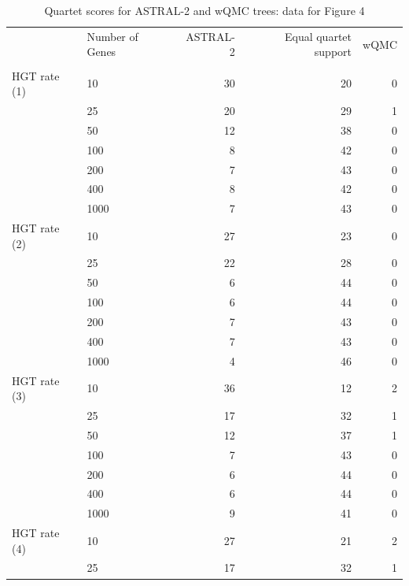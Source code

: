 \begin{table}[h!]
\caption[Quartet scores for ASTRAL-2 and wQMC trees]{Quartet scores for ASTRAL-2 and wQMC trees: data for Figure 4}
\begin{tabular}{llrrr}

   &  Number of Genes    &  ASTRAL-2  &  Equal quartet support &  wQMC  \\ 
&    &                &       &         \\ \hline
HGT rate (1) & 10   &     30           &   20     &     0        \\
   & 25   &   20 &     29 &           1 \\
      & 50   &      12 &     38 &           0         \\
   & 100  &      8 &     42 &           0      \\
   & 200  &        7 &     43 &           0      \\
   & 400  &       8 &     42 &           0       \\
   & 1000 &         7 &     43 &           0    \\ \hline
HGT rate (2) & 10   &    27 &     23 &           0          \\
   &  25   &     22 &     28 &           0      \\
   & 50   &            6 &     44 &           0 \\
   & 100  &             6 &     44 &           0 \\
   & 200  &             7 &     43 &           0 \\
   & 400  &             7 &     43 &           0 \\
   & 1000 &             4 &     46 &           0         \\ \hline
HGT rate (3) & 10   &        36 &     12 &           2 \\
   & 25   &             17 &     32 &           1 \\
   & 50   &           12 &     37 &           1\\
   & 100  &            7 &     43 &           0 \\
   & 200  &             6 &     44 &           0 \\
   & 400  &             6 &     44 &           0 \\
   & 1000 &               9 &     41 &           0 \\ \hline
  HGT rate (4) & 10   &        27 &     21 &           2 \\
   & 25   &            17 &     32 &           1 \\

\end{tabular}
\end{table}
